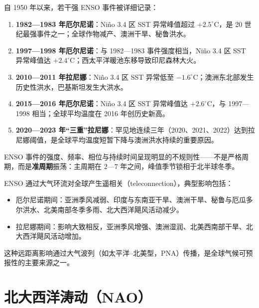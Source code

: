 \begin{example}[典型 ENSO 事件]\label{ex:enso_events}
自 1950 年以来，若干强 ENSO 事件被详细记录：
\begin{enumerate}[label=(\roman*)]
    \item \textbf{1982—1983 年厄尔尼诺}：Niño 3.4 区 SST 异常峰值超过 $+2.5^\circ$C，是 20 世纪最强事件之一；全球作物减产、澳洲干旱、秘鲁洪水。
    \item \textbf{1997—1998 年厄尔尼诺}：与 1982—1983 事件强度相当，Niño 3.4 区 SST 异常峰值达 $+2.4^\circ$C；西太平洋暖池东移导致印尼森林大火。
    \item \textbf{2010—2011 年拉尼娜}：Niño 3.4 区 SST 异常低至 $-1.6^\circ$C；澳洲东北部发生历史性洪水，巴基斯坦发生大洪水。
    \item \textbf{2015—2016 年厄尔尼诺}：Niño 3.4 区 SST 异常峰值达 $+2.6^\circ$C，与 1997—1998 相当；全球平均温度在 2016 年创历史新高。
    \item \textbf{2020—2023 年“三重”拉尼娜}：罕见地连续三年（2020、2021、2022）达到拉尼娜阈值，是全球平均温度短暂下降与澳洲洪水持续的重要原因。
\end{enumerate}
ENSO 事件的强度、频率、相位与持续时间呈现明显的不规则性——不是严格周期，而是\textbf{准周期}振荡：主周期在 $2$—$7$ 年之间，峰值季节锁相于北半球冬季。
\end{example}

\begin{remark}
ENSO 通过大气环流对全球产生遥相关（teleconnection），典型影响包括：
\begin{itemize}
    \item 厄尔尼诺期间：亚洲季风减弱、印度与东南亚干旱、澳洲干旱、秘鲁与厄瓜多尔洪水、北美南部冬季多雨、北大西洋飓风活动减少。
    \item 拉尼娜期间：影响大致相反，亚洲季风增强、澳洲湿润、北美西南部干旱、北大西洋飓风活动增加。
\end{itemize}
这种远距离影响通过大气波列（如太平洋–北美型，PNA）传播，是全球气候可预报性的主要来源之一。
\end{remark}

\section{北大西洋涛动（NAO）}


